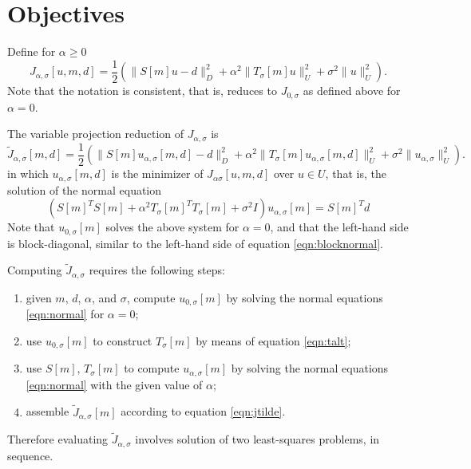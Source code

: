 \section{Objectives}
Define for $\alpha \ge 0$
\begin{equation}
  \label{eqn:j}
 J_{\alpha,\sigma}[u,m,d] = \frac{1}{2}(\|S[m]u - d\|_D^2 + \alpha^2\|T_\sigma[m]u\|_U^2 + \sigma^2 \|u\|^2_U).
\end{equation}
Note that the notation is consistent, that is, reduces to $J_{0,\sigma}$ as defined above for $\alpha=0$.

The variable projection reduction of $J_{\alpha,\sigma}$ is
\begin{equation}
  \label{eqn:jtilde}
 \tilde{J}_{\alpha,\sigma}[m,d] = \frac{1}{2}(\|S[m]u_{\alpha,\sigma}[m,d] - d\|_D^2 + \alpha^2\|T_{\sigma}[m]u_{\alpha,\sigma}[m,d]\|_U^2 + \sigma^2 \|u_{\alpha,\sigma}\|^2_U).
\end{equation}
in which $u_{\alpha,\sigma}[m,d]$ is the minimizer of $J_{\alpha\sigma}[u,m,d]$ over $u \in U$, that is, the solution of the normal equation
\begin{equation}
  \label{eqn:normal}
  (S[m]^TS[m] + \alpha^2T_{\sigma}[m]^TT_{\sigma}[m] + \sigma^2I)u_{\alpha,\sigma}[m] = S[m]^Td
\end{equation}
Note that $u_{0,\sigma}[m]$ solves the above system for $\alpha=0$, and that the left-hand side is block-diagonal, similar to the left-hand side of equation \ref{eqn:blocknormal}.

Computing $\tilde{J}_{\alpha,\sigma}$ requires the following steps:
\begin{enumerate}
\item given $m$, $d$, $\alpha$, and $\sigma$, compute $u_{0,\sigma}[m]$ by solving the normal equations \ref{eqn:normal} for $\alpha=0$;
\item use $u_{0,\sigma}[m]$ to construct $T_{\sigma}[m]$ by means of
  equation \ref{eqn:talt};
\item use $S[m]$, $T_{\sigma}[m]$ to compute $u_{\alpha,\sigma}[m]$ by solving the normal equations \ref{eqn:normal} with the given value of $\alpha$;
\item assemble $\tilde{J}_{\alpha,\sigma}[m]$ according to equation \ref{eqn:jtilde}.
\end{enumerate}

Therefore evaluating $\tilde{J}_{\alpha,\sigma}$ involves solution of
two least-squares problems, in sequence.

